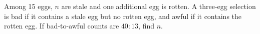 Among 15 eggs, $n$ are stale and one additional egg is rotten. A three-egg selection is bad if it contains a stale egg but no rotten egg, and awful if it contains the rotten egg. If bad-to-awful counts are $40:13$, find $n$.
